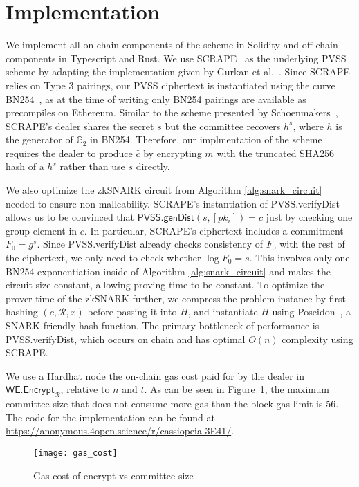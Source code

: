 \section{Implementation}

We implement all on-chain components of the scheme in Solidity and off-chain components in Typescript and Rust.
We use SCRAPE~\cite{pvss_scrape} as the underlying PVSS scheme by adapting the implementation given by Gurkan et al.~\cite{aggregatable_dkg}.
Since SCRAPE relies on Type 3 pairings, our PVSS ciphertext is instantiated using the curve BN254~\cite{bn254}, as at the time of writing only BN254 pairings are available as precompiles on Ethereum.
Similar to the scheme presented by Schoenmakers~\cite{pvss_schoenmakers}, SCRAPE's dealer shares the secret $s$ but the committee recovers $h^s$, where $h$ is the generator of $\mathbb{G}_2$ in BN254.
Therefore, our implmentation of the scheme requires the dealer to produce $\hat{c}$ by encrypting $m$ with the truncated SHA256 hash of a $h^s$ rather than use $s$ directly.

We also optimize the zkSNARK circuit from Algorithm \ref{alg:snark_circuit} needed to ensure non-malleability.
SCRAPE's instantiation of \textsf{PVSS.verifyDist} allows us to be convinced that $\textsf{PVSS.genDist}(s, [pk_i]) = c$ just by checking one group element in $c$.
In particular, SCRAPE's ciphertext includes a commitment $F_0 = g^s$.
Since \textsf{PVSS.verifyDist} already checks consistency of $F_0$ with the rest of the ciphertext, we only need to check whether $\log F_0 = s$.
This involves only one BN254 exponentiation inside of Algorithm \ref{alg:snark_circuit} and makes the circuit size constant, allowing proving time to be constant.
To optimize the prover time of the zkSNARK further, we compress the problem instance by first hashing $(c, \mathcal{R}, x)$ before passing it into $H$, and instantiate $H$ using Poseidon~\cite{poseidon}, a SNARK friendly hash function.
The primary bottleneck of performance is \textsf{PVSS.verifyDist}, which occurs on chain and has optimal $O(n)$ complexity using SCRAPE.


We use a Hardhat node the on-chain gas cost paid for by the dealer in $\textsf{WE.Encrypt}_\mathcal{R}$, relative to $n$ and $t$.
As can be seen in Figure~\ref{fig:gas_cost}, the maximum committee size that does not consume more gas than the block gas limit is 56. 
The code for the implementation can be found at \url{https://anonymous.4open.science/r/cassiopeia-3E41/}.
\begin{figure}\label{fig:gas_cost}
\caption{Gas cost of \textsf{encrypt} vs committee size}
\texttt{[image: gas\_cost]}
\end{figure}



